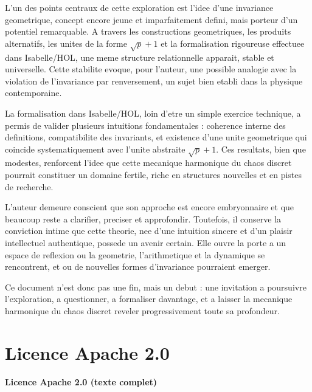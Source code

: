 \documentclass[12pt,a4paper]{article}
\theoremstyle{definition}
\theoremstyle{remark}
\begin{document}
L'un des points centraux de cette exploration est l'idee d'une invariance
geometrique, concept encore jeune et imparfaitement defini, mais porteur
d'un potentiel remarquable. A travers les constructions geometriques, les
produits alternatifs, les unites de la forme $\sqrt{p} + 1$ et la formalisation
rigoureuse effectuee dans Isabelle/HOL, une meme structure relationnelle
apparait, stable et universelle. Cette stabilite evoque, pour l'auteur, une
possible analogie avec la violation de l'invariance par renversement, un sujet
bien etabli dans la physique contemporaine.

La formalisation dans Isabelle/HOL, loin d'etre un simple exercice technique,
a permis de valider plusieurs intuitions fondamentales : coherence interne des
definitions, compatibilite des invariants, et existence d'une unite geometrique
qui coincide systematiquement avec l'unite abstraite $\sqrt{p} + 1$. Ces
resultats, bien que modestes, renforcent l'idee que cette mecanique harmonique
du chaos discret pourrait constituer un domaine fertile, riche en structures
nouvelles et en pistes de recherche.

L'auteur demeure conscient que son approche est encore embryonnaire et que
beaucoup reste a clarifier, preciser et approfondir. Toutefois, il conserve la
conviction intime que cette theorie, nee d'une intuition sincere et d'un
plaisir intellectuel authentique, possede un avenir certain. Elle ouvre la
porte a un espace de reflexion ou la geometrie, l'arithmetique et la dynamique
se rencontrent, et ou de nouvelles formes d'invariance pourraient emerger.

Ce document n'est donc pas une fin, mais un debut : une invitation a poursuivre
l'exploration, a questionner, a formaliser davantage, et a laisser la mecanique
harmonique du chaos discret reveler progressivement toute sa profondeur.

\section{Licence Apache 2.0}
\bigskip
\noindent\textbf{Licence Apache 2.0 (texte complet)}
\end{document}
